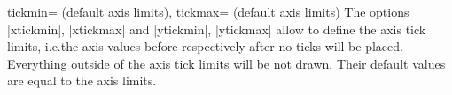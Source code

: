 \begin{pgfplotsxykeylist}{%
    \x tickmin= (default axis limits),
    \x tickmax= (default axis limits)%
}
    The options |xtickmin|, |xtickmax| and |ytickmin|, |ytickmax| allow to
    define the axis tick limits, i.e.\@ the axis values before respectively
    after no ticks will be placed. Everything outside of the axis tick limits
    will be not drawn. Their default values are equal to the axis limits.
\begin{codeexample}[]
\end{codeexample}
\end{pgfplotsxykeylist}

